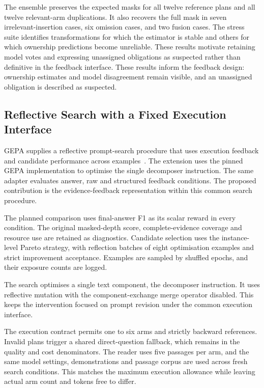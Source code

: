 The ensemble preserves the expected masks for all twelve reference plans
and all twelve relevant-arm duplications. It also recovers the full mask
in seven irrelevant-insertion cases, six omission cases, and two fusion
cases. The stress suite identifies transformations for which the estimator is stable and others for which ownership predictions become unreliable. These results motivate retaining model votes and expressing unassigned obligations as suspected rather than definitive in the feedback interface. These results inform the feedback
design: ownership estimates and model disagreement remain visible, and an
unassigned obligation is described as suspected.

\subsection{Reflective Search with a Fixed Execution Interface}

GEPA supplies a reflective prompt-search procedure that uses execution
feedback and candidate performance across examples~\cite{ch5-gepa}. The
extension uses the pinned GEPA implementation to optimise the single
decomposer instruction. The same adapter evaluates answer, raw and
structured feedback conditions. The proposed contribution is the
evidence-feedback representation within this common search procedure.

The planned comparison uses final-answer F1 as its scalar reward in every
condition. The original masked-depth score, complete-evidence coverage and
resource use are retained as diagnostics. Candidate selection uses the
instance-level Pareto strategy, with reflection batches of eight optimisation
examples and strict improvement acceptance. Examples are sampled by shuffled
epochs, and their exposure counts are logged.

The search optimises a single text component, the decomposer instruction.
It uses reflective mutation with the component-exchange merge operator
disabled. This keeps the intervention focused on prompt revision under the
common execution interface.

The execution contract permits one to six arms and strictly backward
references. Invalid plans trigger a shared direct-question fallback, which
remains in the quality and cost denominators. The reader uses five passages
per arm, and the same model settings, demonstrations and passage corpus are
used across fresh search conditions. This matches the maximum execution
allowance while leaving actual arm count and tokens free to differ.

